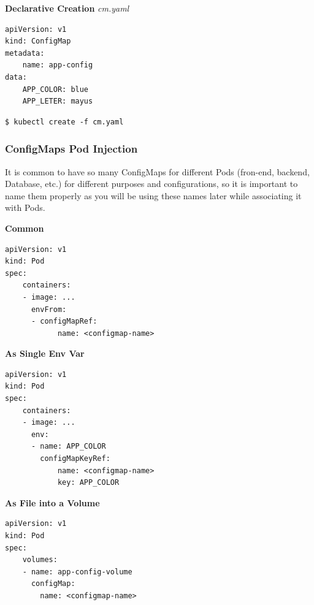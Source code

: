 \documentclass{article}
\newenvironment{blocktemplateI}[1]{%
    \tcolorbox[beamer,%
    noparskip,breakable,
    colframe=Violet,%
    colbacklower=Black,%
    title=#1]}%
    {\endtcolorbox}
\newenvironment{codetemplate}[1][]{%
  \mybasecolorbox[#1]
  \itshape
}{%
  \endmybasecolorbox
}
\begin{document}
\textbf{Declarative Creation}
\begin{codetemplate}{cm.yaml}
\begin{verbatim}
apiVersion: v1
kind: ConfigMap
metadata:
    name: app-config
data:
    APP_COLOR: blue
    APP_LETER: mayus
\end{verbatim}
\end{codetemplate}
\begin{codetemplate}{}
\begin{verbatim}
$ kubectl create -f cm.yaml
\end{verbatim}
\end{codetemplate}


\subsubsection{ConfigMaps Pod Injection}

\begin{blocktemplateI}{NOTE}
It is common to have so many ConfigMaps for different Pods (fron-end, backend, Database, etc.) for different purposes and configurations, so it is important to name them properly as you will be using these names later while associating it with Pods.
\end{blocktemplateI}

\textbf{Common }

\begin{codetemplate}{}
\begin{verbatim}
apiVersion: v1
kind: Pod
spec:
    containers:
    - image: ...
      envFrom:
      - configMapRef:
            name: <configmap-name>  
\end{verbatim}
\end{codetemplate}

\textbf{As Single Env Var}
\begin{codetemplate}{}
\begin{verbatim}
apiVersion: v1
kind: Pod
spec:
    containers:
    - image: ...
      env:
      - name: APP_COLOR
        configMapKeyRef:
            name: <configmap-name>
            key: APP_COLOR
\end{verbatim}
\end{codetemplate}

\textbf{As File into a Volume}
\begin{codetemplate}{}
\begin{verbatim}
apiVersion: v1
kind: Pod
spec:
    volumes:
    - name: app-config-volume
      configMap:
        name: <configmap-name>
\end{verbatim}
\end{codetemplate}
\end{document}
